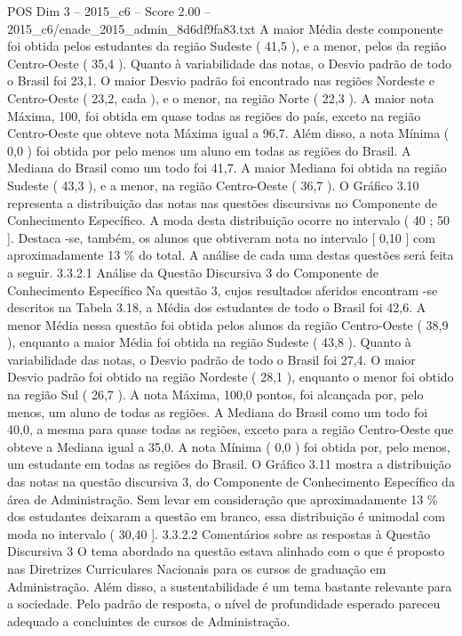 \begin{textsample}{POS Dim 3 – 2015\_c6 – Score 2.00 – 2015\_c6/enade\_2015\_admin\_8d6df9fa83.txt}
A maior Média deste componente foi obtida pelos estudantes da região Sudeste ( 41,5 ), e a menor, pelos da região Centro-Oeste ( 35,4 ).
Quanto à variabilidade das notas, o Desvio padrão de todo o Brasil foi 23,1.
O maior Desvio padrão foi encontrado nas regiões Nordeste e Centro-Oeste ( 23,2, cada ), e o menor, na região Norte ( 22,3 ).
A maior nota Máxima, 100, foi obtida em quase todas as regiões do país, exceto na região Centro-Oeste que obteve nota Máxima igual a 96,7.
Além disso, a nota Mínima ( 0,0 ) foi obtida por pelo menos um aluno em todas as regiões do Brasil.
A Mediana do Brasil como um todo foi 41,7.
A maior Mediana foi obtida na região Sudeste ( 43,3 ), e a menor, na região Centro-Oeste ( 36,7 ).
O Gráfico 3.10 representa a distribuição das notas nas questões discursivas no Componente de Conhecimento Específico.
A moda desta distribuição ocorre no intervalo ( 40 ; 50 ].
Destaca -se, também, os alunos que obtiveram nota no intervalo [ 0,10 ] com aproximadamente 13 \% do total.
A análise de cada uma destas questões será feita a seguir. 3.3.2.1 Análise da Questão Discursiva 3 do Componente de Conhecimento Específico Na questão 3, cujos resultados aferidos encontram -se descritos na Tabela 3.18, a Média dos estudantes de todo o Brasil foi 42,6.
A menor Média nessa questão foi obtida pelos alunos da região Centro-Oeste ( 38,9 ), enquanto a maior Média foi obtida na região Sudeste ( 43,8 ).
Quanto à variabilidade das notas, o Desvio padrão de todo o Brasil foi 27,4.
O maior Desvio padrão foi obtido na região Nordeste ( 28,1 ), enquanto o menor foi obtido na região Sul ( 26,7 ).
A nota Máxima, 100,0 pontos, foi alcançada por, pelo menos, um aluno de todas as regiões.
A Mediana do Brasil como um todo foi 40,0, a mesma para quase todas as regiões, exceto para a região Centro-Oeste que obteve a Mediana igual a 35,0.
A nota Mínima ( 0,0 ) foi obtida por, pelo menos, um estudante em todas as regiões do Brasil.
O Gráfico 3.11 mostra a distribuição das notas na questão discursiva 3, do Componente de Conhecimento Específico da área de Administração.
Sem levar em consideração que aproximadamente 13 \% dos estudantes deixaram a questão em branco, essa distribuição é unimodal com moda no intervalo ( 30,40 ]. 3.3.2.2 Comentários sobre as respostas à Questão Discursiva 3 O tema abordado na questão estava alinhado com o que é proposto nas Diretrizes Curriculares Nacionais para os cursos de graduação em Administração.
Além disso, a sustentabilidade é um tema bastante relevante para a sociedade.
Pelo padrão de resposta, o nível de profundidade esperado pareceu adequado a concluintes de cursos de Administração.

\end{textsample}

